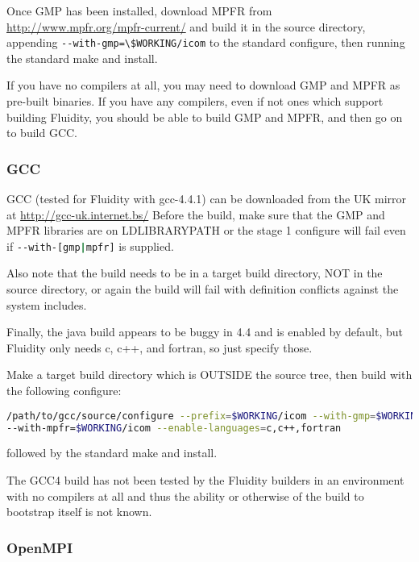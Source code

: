 Once GMP has been installed, download MPFR from
\url{http://www.mpfr.org/mpfr-current/} and build it in the source directory,
appending \lstinline[language=bash]+--with-gmp=\$WORKING/icom+ to the standard
configure, then running the standard make and install.

If you have no compilers at all, you may need to download GMP and MPFR as
pre-built binaries. If you have any compilers, even if not ones which support
building Fluidity, you should be able to build GMP and MPFR, and then go on to
build GCC.

\subsubsection{GCC}
\label{sec:required_libraries_compilers_gcc}

GCC (tested for Fluidity with gcc-4.4.1) can be downloaded from the UK mirror
at \url{http://gcc-uk.internet.bs/} Before the build, make sure that the GMP
and MPFR libraries are on LD{\textunderscore}LIBRARY{\textunderscore}PATH or
the stage 1 configure will fail even if
\lstinline[language=bash]+--with-[gmp|mpfr]+ is supplied.

Also note that the build needs to be in a target build directory, NOT in the
source directory, or again the build will fail with definition conflicts
against the system includes.

Finally, the java build appears to be buggy in 4.4 and is enabled by default,
but Fluidity only needs c, c++, and fortran, so just specify those.

Make a target build directory which is OUTSIDE the source tree, then build
with the following configure:

\begin{lstlisting}[language=bash]
/path/to/gcc/source/configure --prefix=$WORKING/icom --with-gmp=$WORKING/icom
--with-mpfr=$WORKING/icom --enable-languages=c,c++,fortran
\end{lstlisting}

followed by the standard make and install.

The GCC4 build has not been tested by the Fluidity builders in an environment
with no compilers at all and thus the ability or otherwise of the build to
bootstrap itself is not known.

\subsubsection{OpenMPI}
\label{sec:required_libraries_compilers_openmpi}

